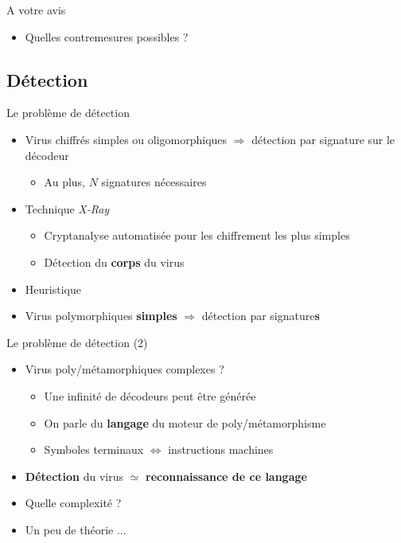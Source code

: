 \documentclass{beamer}
\begin{document}
\begin{frame}{A votre avis}
\begin{itemize}
\item \huge{Quelles contremesures possibles ?}
\end{itemize}
\end{frame}

\subsection{Détection}

\begin{frame}{Le problème de détection}
\begin{itemize}
\item Virus chiffrés simples ou oligomorphiques $\Rightarrow$ détection par signature sur le décodeur
\begin{itemize}
\item Au plus, $N$ signatures nécessaires
\end{itemize}
\item Technique \textit{X-Ray}
\begin{itemize}
\item Cryptanalyse automatisée pour les chiffrement les plus simples
\item Détection du \textbf{corps} du virus
\end{itemize}
\item Heuristique
\item Virus polymorphiques \textbf{simples} $\Rightarrow$ détection par signature\textbf{s}
\end{itemize}
\end{frame}


\begin{frame}{Le problème de détection (2)}
\begin{itemize}
\item Virus poly/métamorphiques complexes ?
\begin{itemize}
\item Une infinité de décodeurs peut être générée
\item On parle du \textbf{langage} du moteur de poly/métamorphisme
\item Symboles terminaux $\Leftrightarrow$ instructions machines
\end{itemize}
\item \textbf{Détection} du virus $\simeq$ \textbf{reconnaissance de ce langage}
\item Quelle complexité ?
\item Un peu de théorie ...
\end{itemize}
\end{frame}
\end{document}
